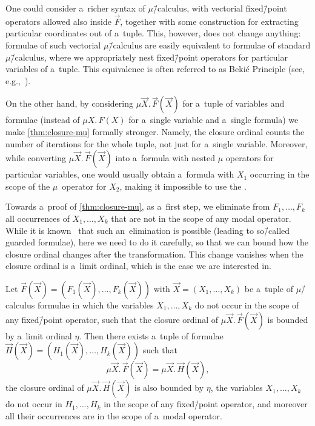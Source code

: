 \begin{rem}
	One could consider a~richer syntax of $\mu$\=/calculus, with vectorial fixed\=/point operators allowed also inside $\vec{F}$, together with some construction for extracting particular coordinates out of a~tuple.
	This, however, does not change anything: formulae of such vectorial $\mu$\=/calculus are easily equivalent to formulae of standard $\mu$\=/calculus,
	where we appropriately nest fixed\=/point operators for particular variables of a~tuple. This equivalence is often referred to as Bekić Principle (see, e.g.,~\cite{Bekic1984}).

	On the other hand, by considering $\mu \vec{X}.\,\vec{F}(\vec{X})$ for a~tuple of variables and formulae (instead of $\mu X.\,F(X)$ for a~single variable and a~single formula)
	we make \cref{thm:closure-mu} formally stronger.
	Namely, the closure ordinal counts the number of iterations for the whole tuple, not just for a~single variable.
	Moreover, while converting $\mu \vec{X}.\,\vec{F}(\vec{X})$ into a~formula with nested $\mu$ operators for particular variables,
	one would usually obtain a~formula with $X_1$ occurring in the scope of the $\mu$~operator for $X_2$, making it impossible to use the .
\end{rem}

Towards a~proof of \cref{thm:closure-mu}, as a~first step, we eliminate from $F_1,\dots,F_k$ all occurrences of $X_1,\dots,X_k$ that are not in the scope of any modal operator.
While it is known~\cite{kozen-mu-calc} that such an~elimination is possible (leading to so\=/called guarded formulae), here we need to do it carefully,
so that we can bound how the closure ordinal changes after the transformation.
This change vanishes when the closure ordinal is a~limit ordinal, which is the case we are interested in.

\begin{lem}\label{lem:guarded}
	Let $\vec{F}(\vec{X})=(F_1(\vec{X}),\dots,F_k(\vec{X}))$ with $\vec{X}=(X_1,\dots,X_k)$ be a~tuple of $\mu$\=/calculus formulae in which the variables $X_1,\dots,X_k$ do not occur in the scope of any fixed\=/point operator,
	such that the closure ordinal of $\mu\vec{X}.\,\vec{F}(\vec{X})$ is bounded by a~limit ordinal $\eta$.
	Then there exists a~tuple of formulae $\vec{H}(\vec{X})=(H_1(\vec{X}),\dots,H_k(\vec{X}))$ such that
	\[
		\mu\vec{X}.\,\vec{F}(\vec{X}) = \mu\vec{X}.\,\vec{H}(\vec{X}),
	\]
	the closure ordinal of $\mu\vec{X}.\,\vec{H}(\vec{X})$ is also bounded by $\eta$,
	the variables $X_1,\dots,X_k$ do not occur in $H_1,\dots,H_k$ in the scope of any fixed\=/point operator,
	and moreover all their occurrences are in the scope of a~modal operator.
\end{lem}


